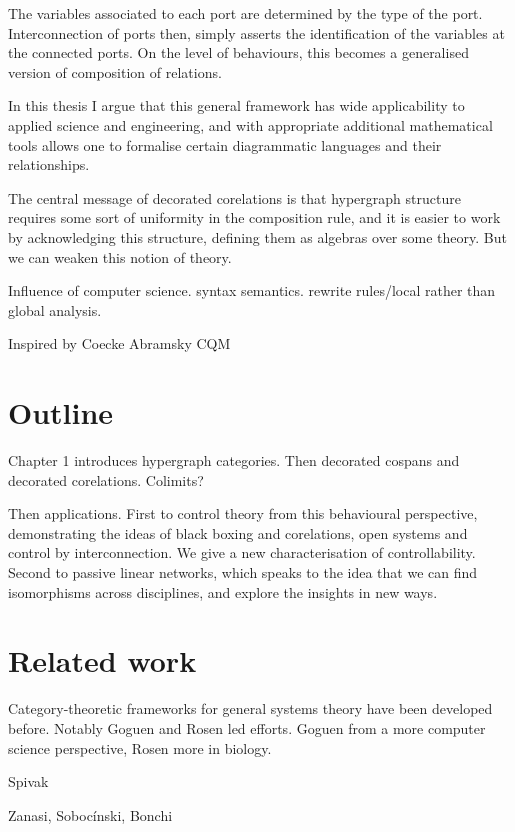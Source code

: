 
The variables associated to each port are determined by the type of the port.
Interconnection of ports then, simply asserts the identification of the
variables at the connected ports. On the level of behaviours, this becomes a
generalised version of composition of relations.

In this thesis I argue that this general framework has wide applicability to
applied science and engineering, and with appropriate additional mathematical
tools allows one to formalise certain diagrammatic languages and their
relationships.

The central message of decorated corelations is that hypergraph structure
requires some sort of uniformity in the composition rule, and it is easier to
work by acknowledging this structure, defining them as algebras over some
theory. But we can weaken this notion of theory.

Influence of computer science. syntax semantics. rewrite rules/local rather than
global analysis.

Inspired by Coecke Abramsky CQM

\section{Outline}
Chapter 1 introduces hypergraph categories. Then decorated cospans and decorated
corelations. Colimits?

Then applications. First to control theory from this behavioural perspective,
demonstrating the ideas of black boxing and corelations, open systems and
control by interconnection. We give a new characterisation of controllability.
Second to passive linear networks, which speaks to the idea that we can find
isomorphisms across disciplines, and explore the insights in new ways.

\section{Related work}

Category-theoretic frameworks for general systems theory have been developed
before. Notably Goguen and Rosen led efforts. Goguen from a more computer
science perspective, Rosen more in biology.



Spivak 

Zanasi, Soboc\'inski, Bonchi

